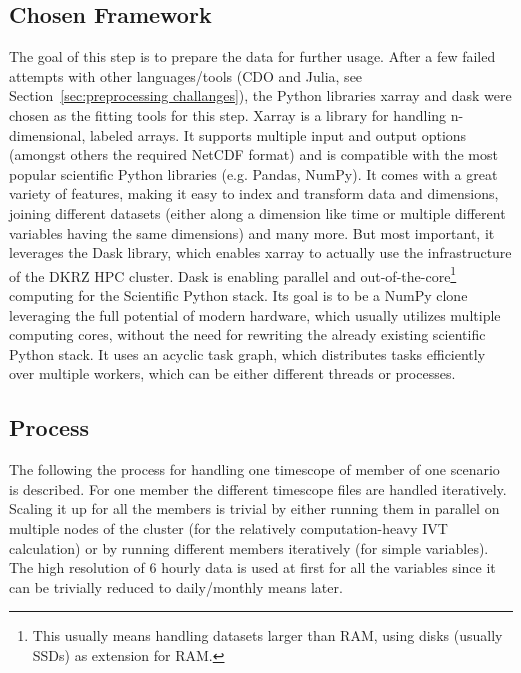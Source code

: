 \subsection{Chosen Framework}
\label{sec:preprocessing_framework}

The goal of this step is to prepare the data for further usage. 
After a few failed attempts with other languages/tools (CDO and Julia, see Section~\ref{sec:preprocessing challanges}), the Python libraries xarray \cite{hoyer_xarray_2017} and dask \cite{rocklin2015dask} were chosen as the fitting tools for this step.
Xarray is a library for handling n-dimensional, labeled arrays. It supports multiple input and output options (amongst others the required NetCDF format) and is compatible with the most popular scientific Python libraries (e.g. Pandas, NumPy). 
It comes with a great variety of features, making it easy to index and transform data and dimensions, joining different datasets (either along a dimension like time or multiple different variables having the same dimensions) and many more. 
But most important, it leverages the Dask library, which enables xarray to actually use the infrastructure of the DKRZ HPC cluster. 
Dask is enabling parallel and out-of-the-core\footnote{This usually means handling datasets larger than RAM, using disks (usually SSDs) as extension for RAM.} computing for the Scientific Python stack. 
Its goal is to be a NumPy clone leveraging the full potential of modern hardware, which usually utilizes multiple computing cores, without the need for rewriting the already existing scientific Python stack. 
It uses an acyclic task graph, which distributes tasks efficiently over multiple workers, which can be either different threads or processes. \cite{rocklin2015dask}


\subsection{Process}

The following the process for handling one timescope of member of one scenario is described. For one member the different timescope files are handled iteratively. 
Scaling it up for all the members is trivial by either running them in parallel on multiple nodes of the cluster (for the relatively computation-heavy IVT calculation) or by running different members iteratively (for simple variables). 
The high resolution of 6 hourly data is used at first for all the variables since it can be trivially reduced to daily/monthly means later. 

